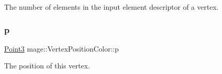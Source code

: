 The number of elements in the input element descriptor of a vertex. \hypertarget{structmage_1_1_vertex_position_color_afe40a78afb8e13e742d93d5092b1a614}{}\label{structmage_1_1_vertex_position_color_afe40a78afb8e13e742d93d5092b1a614} 
\subsubsection{\texorpdfstring{p}{p}}
{\footnotesize\ttfamily \hyperlink{structmage_1_1_point3}{Point3} mage\+::\+Vertex\+Position\+Color\+::p}

The position of this vertex. 